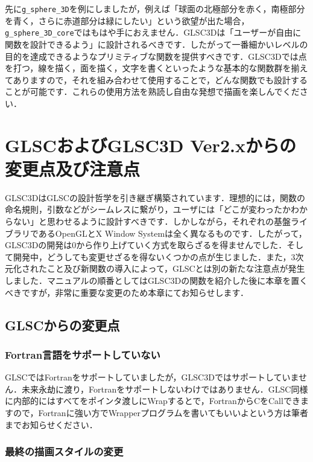 \documentclass[a4paper,12pt]{jsarticle}%
\begin{document}

先に\verb|g_sphere_3D|を例にしましたが，例えば「球面の北極部分を赤く，南極部分を青く，さらに赤道部分は緑にしたい」という欲望が出た場合，\verb|g_sphere_3D_core|ではもはや手におえません．GLSC3Dは「ユーザーが自由に関数を設計できるよう」に設計されるべきです．したがって一番細かいレベルの目的を達成できるようなプリミティブな関数を提供すべきです．GLSC3Dでは点を打つ，線を描く，面を描く，文字を書くといったような基本的な関数群を揃えてありますので，それを組み合わせて使用することで，どんな関数でも設計することが可能です．これらの使用方法を熟読し自由な発想で描画を楽しんでください．

\newpage
\section{GLSCおよびGLSC3D Ver2.xからの変更点及び注意点}

GLSC3DはGLSCの設計哲学を引き継ぎ構築されています．理想的には，関数の命名規則，引数などがシームレスに繋がり，ユーザには「どこが変わったかわからない」と思わせるように設計すべきです．しかしながら，それぞれの基盤ライブラリであるOpenGLとX Window Systemは全く異なるものです．したがって，GLSC3Dの開発は0から作り上げていく方式を取らざるを得ませんでした．そして開発中，どうしても変更せざるを得ないくつかの点が生じました．また，3次元化されたこと及び新関数の導入によって，GLSCとは別の新たな注意点が発生しました．マニュアルの順番としてはGLSC3Dの関数を紹介した後に本章を置くべきですが，非常に重要な変更のため本章にてお知らせします．

\subsection{GLSCからの変更点}

\subsubsection{Fortran言語をサポートしていない}

GLSCではFortranをサポートしていましたが，GLSC3Dではサポートしていません．未来永劫に渡り，Fortranをサポートしないわけではありません．GLSC同様に内部的にはすべてをポインタ渡しにWrapするとで，FortranからCをCallできますので，Fortranに強い方でWrapperプログラムを書いてもいいよという方は筆者までお知らせください．

\subsubsection{最終の描画スタイルの変更}
\end{document}

